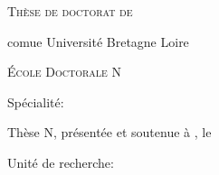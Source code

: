 \begin{cover}
  \vspace{4.5cm}
  \setlength{\parindent}{0cm}%
  {\scshape
    {\Huge Thèse de doctorat de}
    \vspace{2.5cm}

    \LARGE\theInstitution
    \smallskip

    comue Université Bretagne Loire
  }

  \vspace{1cm}

  {\Large
    \textsc{\'Ecole Doctorale N\textordmasculine\:\DSNumber}
    \smallskip
    
    \textit{\DSFullName}
    \smallskip

    Spécialité: \MySpeciality
  }

  \vspace{1cm}

  \begin{minipage}{.8\pagewidth}
    \centering
    \huge\MyTitleFRA
    \medskip

    \Large\MySubTitleFRA
  \end{minipage}

  \bigskip

  \begin{flushright}
    \huge\MyAuthor
  \end{flushright}

  \vspace{8mm}

  Thèse N\textordmasculine\:\MyThesisNumber{}, présentée et soutenue à \MyPlace, le \MyDate
  \smallskip

  Unité de recherche: \MyInstitute

  \vspace{1cm}


\end{cover}
